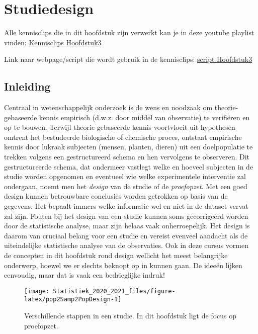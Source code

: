 \documentclass[
  12pt,dutch,coursenotes]{book}
\theoremstyle{definition}
\theoremstyle{definition}
\theoremstyle{definition}
\theoremstyle{remark}
\begin{document}
\hypertarget{chap:design}{%
\chapter{Studiedesign}\label{chap:design}}

Alle kennisclips die in dit hoofdstuk zijn verwerkt kan je in deze youtube playlist vinden: \href{https://www.youtube.com/playlist?list=PLZH1hP8_LbJL1GjhnpEDlx78OJ6qUzSix}{Kennisclips Hoofdstuk3}

Link naar webpage/script die wordt gebruik in de kennisclips: \href{https://statomics.github.io/sbc20/rmd/03-experimentalDesign.html}{script Hoofdstuk3}

\hypertarget{inleiding-2}{%
\section{Inleiding}\label{inleiding-2}}

Centraal in wetenschappelijk onderzoek is de wens en noodzaak om
theorie-gebaseerde kennis empirisch (d.w.z. door middel van observatie) te
verifiëren en op te bouwen. Terwijl theorie-gebaseerde kennis voortvloeit uit hypothesen
omtrent het bestudeerde biologische of chemische proces, ontstaat empirische
kennis door lukraak subjecten (mensen, planten, dieren) uit een doelpopulatie te
trekken volgens een gestructureerd schema en hen vervolgens te observeren.
Dit gestructureerde schema, dat ondermeer vastlegt welke en hoeveel
subjecten in de studie worden opgenomen en eventueel wie welke experimentele
interventie zal ondergaan, noemt men het \emph{design} van de studie of de
\emph{proefopzet}. Met een goed design kunnen betrouwbare conclusies
worden getrokken op basis van de gegevens. Het bepaalt immers welke
informatie wel en niet in de dataset vervat zal zijn. Fouten bij het design
van een studie kunnen soms gecorrigeerd worden door de statistische analyse,
maar zijn helaas vaak onherroepelijk. Het design is daarom van cruciaal
belang voor een studie en vereist evenveel aandacht als de uiteindelijke
statistische analyse van de observaties. Ook in deze cursus vormen de
concepten in dit hoofdstuk rond design wellicht het meest
belangrijke onderwerp, hoewel we er slechts beknopt op in kunnen gaan. De
ideeën lijken eenvoudig, maar dat is vaak een bedrieglijke indruk!

\begin{figure}

{\centering \texttt{[image: Statistiek\_2020\_2021\_files/figure-latex/pop2Samp2PopDesign-1]} 

}

\caption{Verschillende stappen in een studie. In dit hoofdstuk ligt de focus op proefopzet.}\label{fig:pop2Samp2PopDesign}
\end{figure}
\end{document}
